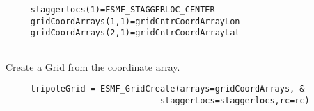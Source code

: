  \begin{verbatim}
     staggerlocs(1)=ESMF_STAGGERLOC_CENTER
     gridCoordArrays(1,1)=gridCntrCoordArrayLon     
     gridCoordArrays(2,1)=gridCntrCoordArrayLat     
 
\end{verbatim}
 

      Create a Grid from the coordinate array.  

 \begin{verbatim}
     tripoleGrid = ESMF_GridCreate(arrays=gridCoordArrays, &
                               staggerLocs=staggerlocs,rc=rc)
 
\end{verbatim}

\setlength{\parskip}{\oldparskip}
\setlength{\parindent}{\oldparindent}
\setlength{\baselineskip}{\oldbaselineskip}
